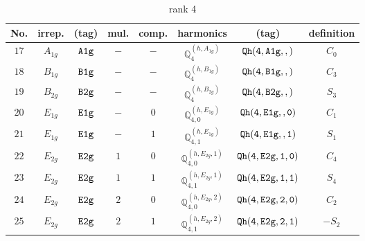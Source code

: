 \documentclass[fleqn,8pt]{jsarticle}
\begin{document}
\begin{table}[ht!]
\begin{center}
\caption{rank 4}
\renewcommand{\arraystretch}{1.3}
\begin{tabular}{cccccccc} \hline \hline
No. & irrep. & (tag) & mul. & comp. & harmonics & (tag) & definition \\ \hline
$ 17 $ & $ A_{1g} $ & $ {\tt A1g} $ & $ - $ & $ - $ & $ \mathbb{Q}_{4}^{(h,A_{1g})} $ & $ {\tt Qh(4,A1g,,)} $ & $ C_{0} $ \\
$ 18 $ & $ B_{1g} $ & $ {\tt B1g} $ & $ - $ & $ - $ & $ \mathbb{Q}_{4}^{(h,B_{1g})} $ & $ {\tt Qh(4,B1g,,)} $ & $ C_{3} $ \\
$ 19 $ & $ B_{2g} $ & $ {\tt B2g} $ & $ - $ & $ - $ & $ \mathbb{Q}_{4}^{(h,B_{2g})} $ & $ {\tt Qh(4,B2g,,)} $ & $ S_{3} $ \\
$ 20 $ & $ E_{1g} $ & $ {\tt E1g} $ & $ - $ & $ 0 $ & $ \mathbb{Q}_{4,0}^{(h,E_{1g})} $ & $ {\tt Qh(4,E1g,,0)} $ & $ C_{1} $ \\
$ 21 $ & $ E_{1g} $ & $ {\tt E1g} $ & $ - $ & $ 1 $ & $ \mathbb{Q}_{4,1}^{(h,E_{1g})} $ & $ {\tt Qh(4,E1g,,1)} $ & $ S_{1} $ \\
$ 22 $ & $ E_{2g} $ & $ {\tt E2g} $ & $ 1 $ & $ 0 $ & $ \mathbb{Q}_{4,0}^{(h,E_{2g},1)} $ & $ {\tt Qh(4,E2g,1,0)} $ & $ C_{4} $ \\
$ 23 $ & $ E_{2g} $ & $ {\tt E2g} $ & $ 1 $ & $ 1 $ & $ \mathbb{Q}_{4,1}^{(h,E_{2g},1)} $ & $ {\tt Qh(4,E2g,1,1)} $ & $ S_{4} $ \\
$ 24 $ & $ E_{2g} $ & $ {\tt E2g} $ & $ 2 $ & $ 0 $ & $ \mathbb{Q}_{4,0}^{(h,E_{2g},2)} $ & $ {\tt Qh(4,E2g,2,0)} $ & $ C_{2} $ \\
$ 25 $ & $ E_{2g} $ & $ {\tt E2g} $ & $ 2 $ & $ 1 $ & $ \mathbb{Q}_{4,1}^{(h,E_{2g},2)} $ & $ {\tt Qh(4,E2g,2,1)} $ & $ - S_{2} $ \\
 \hline \hline
\end{tabular}
\end{center}
\end{table}
\end{document}
